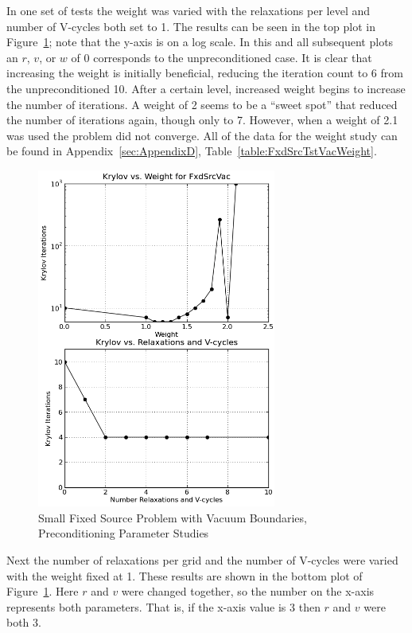 In one set of tests the weight was varied with the relaxations per level and number of V-cycles both set to 1. The results can be seen in the top plot in Figure~\ref{fig:FxdSrcVac}; note that the y-axis is on a log scale. In this and all subsequent plots an $r$, $v$, or $w$ of 0 corresponds to the unpreconditioned case. It is clear that increasing the weight is initially beneficial, reducing the iteration count to 6 from the unpreconditioned 10. After a certain level, increased weight begins to increase the number of iterations. A weight of 2 seems to be a ``sweet spot'' that reduced the number of iterations again, though only to 7. However, when a weight of 2.1 was used the problem did not converge. All of the data for the weight study can be found in Appendix~\ref{sec:AppendixD}, Table~\ref{table:FxdSrcTstVacWeight}.
%
\begin{figure}[!ht]
    \begin{center}
      \includegraphics [width=0.7\textwidth, height=0.8\textheight] {FxdSrcVac}
   \end{center}
   \caption{Small Fixed Source Problem with Vacuum Boundaries, Preconditioning Parameter Studies}
   \label{fig:FxdSrcVac}
\end{figure}

Next the number of relaxations per grid and the number of V-cycles were varied with the weight fixed at 1. These results are shown in the bottom plot of Figure~\ref{fig:FxdSrcVac}. Here $r$ and $v$ were changed together, so the number on the x-axis represents both parameters. That is, if the x-axis value is 3 then $r$ and $v$ were both 3. 

